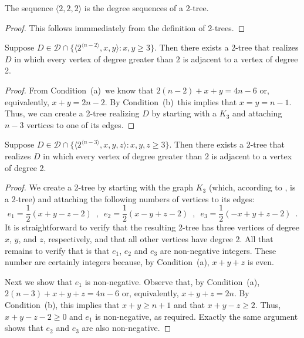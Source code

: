 \documentclass[lotsofwhite,charterfonts]{patmorin}
\newcommand{\rep}[1]{^{\langle#1\rangle}}
\newcommand{\degreesum}{Condition~(a)}
\newcommand{\maxdegree}{Condition~(b)}
\begin{document}
\begin{lem}
The sequence $\langle 2,2,2\rangle$ is the degree sequences of a 2-tree.
\end{lem}

\begin{proof}
This follows immmediately from the definition of 2-trees.
\end{proof}


\begin{lem}
Suppose $D\in \mathcal{D}\cap \{\langle 2\rep{n-2},x,y\rangle:
x,y\ge 3\}$. 
Then there exists a 2-tree that realizes $D$ in which every vertex of
degree greater than $2$ is adjacent to a vertex of degree 2.
\end{lem}

\begin{proof}
From \degreesum\ we know that $2(n-2)+x+y=4n-6$ or, equivalently,
$x+y=2n-2$.  By \maxdegree\ this implies that $x=y=n-1$.  Thus,
we can create a 2-tree realizing $D$ by starting with a $K_3$ and
attaching $n-3$ vertices to one of its edges.
\end{proof}

\begin{lem}
Suppose $D\in \mathcal{D}\cap \{\langle 2\rep{n-3},x,y,z\rangle:
x,y,z\ge 3\}$. 
Then there exists a 2-tree that realizes $D$ in which every vertex of
degree greater than $2$ is adjacent to a vertex of degree 2.
\end{lem}

\begin{proof}
We create a 2-tree by starting with the graph $K_3$ (which, according
to , is a
2-tree) and attaching the following numbers of vertices to its edges:
\[
    e_1=\frac{1}{2}(x+y-z-2) \enspace , \enspace
    e_2=\frac{1}{2}(x-y+z-2) \enspace , \enspace 
    e_3=\frac{1}{2}(-x+y+z-2) \enspace .
\]
It is straightforward to verify that the resulting 2-tree has three
vertices of degree $x$, $y$, and $z$, respectively, and that all other
vertices have degree 2.  All that remains to verify that is that
$e_1$, $e_2$ and $e_3$ are non-negative integers.  These number are
certainly integers because, by \degreesum, $x+y+z$ is even.  

Next we show that $e_1$ is non-negative.  Observe that, by \degreesum,
$2(n-3)+x+y+z = 4n-6$ or, equivalently, $x+y+z=2n$.  By \maxdegree,
this implies that $x+y \ge n+1$ and that $x+y-z \ge 2$.  Thus,
$x+y-z-2 \ge 0$ and $e_1$ is non-negative, as required.  
Exactly the same argument shows that $e_2$ and $e_3$ are also
non-negative.
\end{proof}
\end{document}
